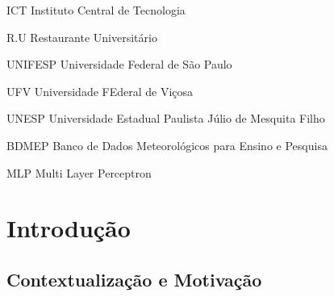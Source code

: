 \documentclass[	12pt, Times, openright, twoside, a4paper, english, brazil]{abntex2}
\begin{document}
    \listoffigures*
    \cleardoublepage

    \listoftables*
    \cleardoublepage

    \begin{siglas}
    \item[ICT] Instituto Central de Tecnologia
    \item[R.U] Restaurante Universitário
    \item[UNIFESP] Universidade Federal de São Paulo
    \item[UFV] Universidade FEderal de Viçosa
    \item[UNESP] Universidade Estadual Paulista Júlio de Mesquita Filho
    \item[BDMEP] Banco de Dados Meteorológicos para Ensino e Pesquisa
    \item[MLP] Multi Layer Perceptron

    \end{siglas}


    \tableofcontents*
    \cleardoublepage

  \textual

  \chapter{Introdução}
      \section{Contextualização e Motivação}
\end{document}
